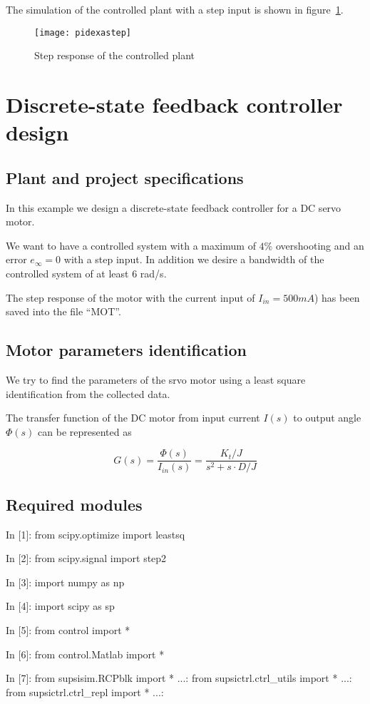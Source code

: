 The simulation of the controlled plant with a step input is shown in 
figure~\ref{F14}.

\begin{figure}[htbp]	%
\centering
\texttt{[image: pidexastep]}
\caption{Step response of the controlled plant}
\label{F14}
\end{figure}

\section{Discrete-state feedback controller design}

\subsection{Plant and project specifications}

In this example we design a discrete-state feedback controller for a DC servo 
motor. 

We want to have a controlled system with a maximum of $4\%$ 
overshooting and an error $e_{\infty}=0$ with a step input. In addition we 
desire a bandwidth of the controlled system of at least $6$ rad/s.

The step response of the motor with the current input of $I_{in}=500mA$) has 
been saved into the file ``MOT''.

\subsection{Motor parameters identification}

We try to find the parameters of the srvo motor using a least square 
identification from the collected data.

The transfer function of the DC motor from input current $I(s)$ to output angle 
$\Phi(s)$ can be represented as

$$
G(s)=\frac{\Phi(s)}{I_{in}(s)}=\frac{K_t/J}{s^2 + s \cdot D/J}
$$

\subsection{Required modules}

\begin{code}
In [1]: from scipy.optimize import leastsq

In [2]: from scipy.signal import step2

In [3]: import numpy as np

In [4]: import scipy as sp

In [5]: from control import *

In [6]: from control.Matlab import *

In [7]: from supsisim.RCPblk import *
   ...: from supsictrl.ctrl_utils import *
   ...: from supsictrl.ctrl_repl import *
   ...: 

\end{code}

